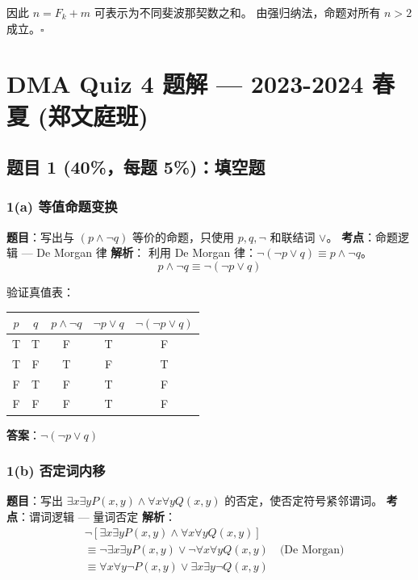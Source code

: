 \documentclass[10pt,a4paper,openany]{ctexbook}
\theoremstyle{definition}
\theoremstyle{remark}
\begin{document}
因此 $n = F_k + m$ 可表示为不同斐波那契数之和。
由强归纳法，命题对所有 $n > 2$ 成立。$\square$
\vspace{-2pt}

\section{DMA Quiz 4 题解 — 2023-2024 春夏 (郑文庭班)}

\vspace{-2pt}

\subsection{题目 1 (40\%，每题 5\%)：填空题}

\subsubsection{1(a) 等值命题变换}

\textbf{题目}：写出与 $(p \land \neg q)$ 等价的命题，只使用 $p, q, \neg$ 和联结词 $\lor$。
\textbf{考点}：命题逻辑 — De Morgan 律
\textbf{解析}：
利用 De Morgan 律：$\neg(\neg p \lor q) \equiv p \land \neg q$。
\[
 p \land \neg q \equiv \neg(\neg p \lor q) 
\]

验证真值表：
\begin{center}
\begin{tabular}{ccccc}
\hline
$p$ & $q$ & $p \land \neg q$ & $\neg p \lor q$ & $\neg(\neg p \lor q)$ \\ \hline
T & T & F & T & F \\
T & F & T & F & T \\
F & T & F & T & F \\
F & F & F & T & F \\
\hline
\end{tabular}

\end{center}

\textbf{答案}：$\boxed{\neg(\neg p \lor q)}$
\vspace{-2pt}

\subsubsection{1(b) 否定词内移}

\textbf{题目}：写出 $\exists x \exists y P(x, y) \land \forall x \forall y Q(x, y)$ 的否定，使否定符号紧邻谓词。
\textbf{考点}：谓词逻辑 — 量词否定
\textbf{解析}：
\[
\begin{aligned}
&\neg[\exists x \exists y P(x, y) \land \forall x \forall y Q(x, y)] \\
&\equiv \neg\exists x \exists y P(x, y) \lor \neg\forall x \forall y Q(x, y) \quad \text{(De Morgan)} \\
&\equiv \forall x \forall y \neg P(x, y) \lor \exists x \exists y \neg Q(x, y)
\end{aligned}
\]
\end{document}
